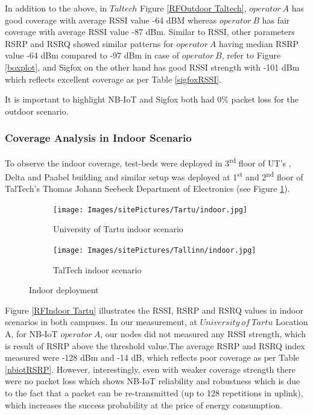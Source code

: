 \documentclass[12pt]{article}
\begin{document}
In addition to the above, in $Taltech$ Figure \ref{RFOutdoor Taltech}, $operator\ A$ has good coverage with average RSSI value -64 dBM whereas $operator\ B$ has fair coverage with average RSSI value -87 dBm. Similar to RSSI, other parameters RSRP and RSRQ showed similar patterns for $operator\ A$ having median RSRP value -64 dBm compared to -97 dBm in case of $operator\ B$, refer to Figure \ref{boxplot}, and Sigfox on the other hand has good RSSI strength with -101 dBm which reflects excellent coverage as per Table \ref{sigfoxRSSI}.\par
It is important to highlight NB-IoT and Sigfox both had 0\% packet loss for the outdoor scenario.




\subsubsection{Coverage Analysis in Indoor Scenario}
To observe the indoor coverage, test-beds were deployed in 3\textsuperscript{rd} floor of UT's , Delta and Paabel building and similar setup was deployed at 1\textsuperscript{st} and 2\textsuperscript{nd} floor of TalTech's Thomas Johann Seebeck Department of Electronics (see Figure \ref{fig:Indoor deployment}).


\begin{figure}[h!]
\centering
\begin{subfigure}[t]{0.42 \linewidth}
  \centering
  \texttt{[image: Images/sitePictures/Tartu/indoor.jpg]}
  \caption{University of Tartu indoor scenario}
  \end{subfigure}
  
  \begin{subfigure}[t]{0.42\linewidth}
    \centering
    \texttt{[image: Images/sitePictures/Tallinn/indoor.jpg]}
    \caption{TalTech indoor scenario}
  \end{subfigure}
   
    \caption{Indoor deployment}
    \label{fig:Indoor deployment}
\end{figure}

Figure \ref{RFIndoor Tartu} illustrates the RSSI, RSRP and RSRQ values in indoor scenarios in both campuses. In our measurement, at $University\ of\ Tartu$ Location A, for NB-IoT $operator\ A$, our nodes did not measured any RSSI strength, which is result of RSRP above the threshold value.The average RSRP and RSRQ index measured were -128 dBm and -14 dB, which reflects poor coverage as per Table \ref{nbiotRSRP}. However, interestingly, even with weaker coverage strength there were no packet loss which shows NB-IoT reliability and robustness which is due to the fact that a packet can be re-transmitted (up to 128 repetitions in uplink), which increases the success probability at the price of energy consumption.
\end{document}
